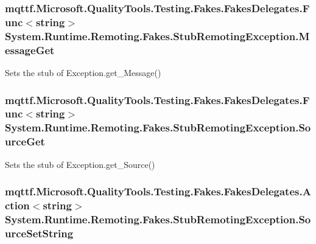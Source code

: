 \hypertarget{class_system_1_1_runtime_1_1_remoting_1_1_fakes_1_1_stub_remoting_exception_a1553992edb7133bff95c7c043d1d88f9}{
\subsubsection[{Message\-Get}]{\setlength{\rightskip}{0pt plus 5cm}mqttf.\-Microsoft.\-Quality\-Tools.\-Testing.\-Fakes.\-Fakes\-Delegates.\-Func$<$string$>$ System.\-Runtime.\-Remoting.\-Fakes.\-Stub\-Remoting\-Exception.\-Message\-Get}}\label{class_system_1_1_runtime_1_1_remoting_1_1_fakes_1_1_stub_remoting_exception_a1553992edb7133bff95c7c043d1d88f9}


Sets the stub of Exception.\-get\-\_\-\-Message()

\hypertarget{class_system_1_1_runtime_1_1_remoting_1_1_fakes_1_1_stub_remoting_exception_a06919048484d6be4b08a99f4a1e59442}{
\subsubsection[{Source\-Get}]{\setlength{\rightskip}{0pt plus 5cm}mqttf.\-Microsoft.\-Quality\-Tools.\-Testing.\-Fakes.\-Fakes\-Delegates.\-Func$<$string$>$ System.\-Runtime.\-Remoting.\-Fakes.\-Stub\-Remoting\-Exception.\-Source\-Get}}\label{class_system_1_1_runtime_1_1_remoting_1_1_fakes_1_1_stub_remoting_exception_a06919048484d6be4b08a99f4a1e59442}


Sets the stub of Exception.\-get\-\_\-\-Source()

\hypertarget{class_system_1_1_runtime_1_1_remoting_1_1_fakes_1_1_stub_remoting_exception_aaa93dccef69a6e344e5d91d6841e4679}{
\subsubsection[{Source\-Set\-String}]{\setlength{\rightskip}{0pt plus 5cm}mqttf.\-Microsoft.\-Quality\-Tools.\-Testing.\-Fakes.\-Fakes\-Delegates.\-Action$<$string$>$ System.\-Runtime.\-Remoting.\-Fakes.\-Stub\-Remoting\-Exception.\-Source\-Set\-String}}\label{class_system_1_1_runtime_1_1_remoting_1_1_fakes_1_1_stub_remoting_exception_aaa93dccef69a6e344e5d91d6841e4679}


